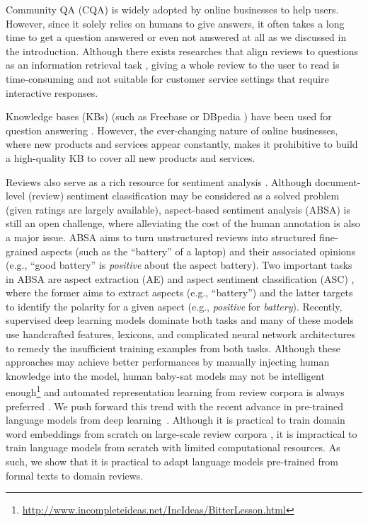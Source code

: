 Community QA (CQA) is widely adopted by online businesses \cite{mcauley2016addressing} to help users.
However, since it solely relies on humans to give answers, it often takes a long time to get a question answered or even not answered at all as we discussed in the introduction.
Although there exists researches that align reviews to questions as an information retrieval task \cite{mcauley2016addressing,yu2018aware}, giving a whole review to the user to read is time-consuming and not suitable for customer service settings that require interactive responses.

Knowledge bases (KBs) (such as Freebase \cite{dong2015question,xu2016question,yao2014information} or DBpedia \cite{lopez2010scaling,unger2012template}) have been used for question answering \cite{yu2018aware}.
However, the ever-changing nature of online businesses, where new products and services appear constantly, makes it prohibitive to build a high-quality KB to cover all new products and services.

Reviews also serve as a rich resource for sentiment analysis \cite{pang2002thumbs,hu2004mining,liu2012sentiment,liu2015sentiment}.
Although document-level (review) sentiment classification may be considered as a solved problem (given ratings are largely available), aspect-based sentiment analysis (ABSA) is still an open challenge, where alleviating the cost of the human annotation is also a major issue.
ABSA aims to turn unstructured reviews into structured fine-grained aspects (such as the ``battery'' of a laptop) and their associated opinions (e.g., ``good battery'' is \emph{positive} about the aspect battery).
Two important tasks in ABSA are aspect extraction (AE) and aspect sentiment classification (ASC) \cite{hu2004mining}, where the former aims to extract aspects (e.g., ``battery'') and the latter targets to identify the polarity for a given aspect (e.g., \emph{positive} for \emph{battery}).
Recently, supervised deep learning models dominate both tasks \cite{wang2016recursive,wang2017coupled,xu_acl2018,tang2016aspect,he2018exploiting} and many of these models use handcrafted features, lexicons, and complicated neural network architectures to remedy the insufficient training examples from both tasks.
Although these approaches may achieve better performances by manually injecting human knowledge into the model, human baby-sat models may not be intelligent enough\footnote{\url{http://www.incompleteideas.net/IncIdeas/BitterLesson.html}} and automated representation learning from review corpora is always preferred \cite{xu_acl2018,he2018exploiting}.
We push forward this trend with the recent advance in pre-trained language models from deep learning~\cite{peters2018deep,howard2018universal,devlin2018bert,radford2018improving,radford2018lang}. 
Although it is practical to train domain word embeddings from scratch on large-scale review corpora \cite{xu_acl2018}, it is impractical to train language models from scratch with limited computational resources.
As such, we show that it is practical to adapt language models pre-trained from formal texts to domain reviews.


